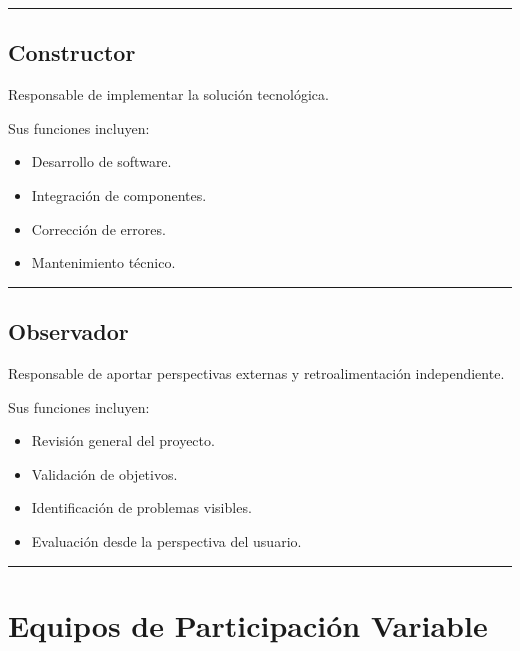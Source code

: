 \documentclass[14pt,a4paper,oneside]{extbook}
\begin{document}
\par\vspace{1.5em}\noindent\hfill\rule{0.25\textwidth}{0.6pt}\hfill\par\vspace{1.5em}

\subsection{Constructor}

Responsable de implementar la solución tecnológica.

Sus funciones incluyen:

\begin{itemize}
\item Desarrollo de software.
\item Integración de componentes.
\item Corrección de errores.
\item Mantenimiento técnico.
\end{itemize}

\par\vspace{1.5em}\noindent\hfill\rule{0.25\textwidth}{0.6pt}\hfill\par\vspace{1.5em}

\subsection{Observador}

Responsable de aportar perspectivas externas y retroalimentación independiente.

Sus funciones incluyen:

\begin{itemize}
\item Revisión general del proyecto.
\item Validación de objetivos.
\item Identificación de problemas visibles.
\item Evaluación desde la perspectiva del usuario.
\end{itemize}

\par\vspace{1.5em}\noindent\hfill\rule{0.25\textwidth}{0.6pt}\hfill\par\vspace{1.5em}

\section{Equipos de Participación Variable}
\end{document}
